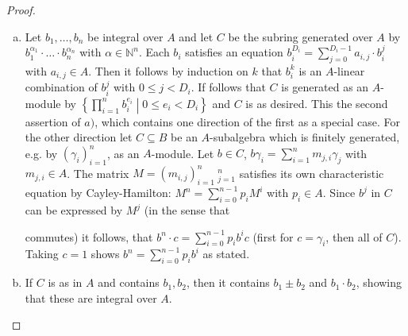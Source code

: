 \documentclass[DIV=14,parskip=half]{scrartcl}
\newenvironment{alphanumerate}{\begin{enumerate}[a)]}{\end{enumerate}}
\theoremstyle{definition}
\newcommand{\N}{\mathbb{N}}
\newcommand{\ldotspam}{,\ldots,}
\begin{document}
\begin{proof}
 \begin{alphanumerate}
  \item Let $b_1\ldotspam b_n$ be integral over $A$ and let $C$ be the subring generated over $A$ by $b_1^{\alpha_1}\cdot\ldots\cdot b_n^{\alpha_n}$ with $\alpha\in \N^n$. Each $b_i$ satisfies an equation $b_i^{D_i} = \sum_{j=0}^{D_i-1} a_{i,j}\cdot b_i^j$ with $a_{i,j}\in A$. Then it follows by induction on $k$ that $b_i^k$ is an $A$-linear combination of $b_i^j$ with $0\leq j < D_i$. If follows that $C$ is generated as an $A$-module by $\left\{\prod_{i=1}^n b_i^{e_i}\middle| 0\leq e_i< D_i\right\}$ and $C$ is as desired. This the second assertion of $a)$, which contains one direction of the first as a special case. For the other direction let $C\subseteq B$ be an $A$-subalgebra which is finitely generated, e.g. by $(\gamma_i)_{i=1}^n$, as an $A$-module. Let $b\in C$, $b\gamma_i=\sum_{i=1}^n m_{j,i} \gamma_j$ with $m_{j,i}\in A$. The matrix $M=(m_{i,j})_{i=1}^n\ _{j=1}^n$ satisfies its own characteristic equation by Cayley-Hamilton: $M^n = \sum_{i=0}^{n-1}p_i M^i$ with $p_i\in A$. Since $b^j$ in $C$ can be expressed by $M^j$ (in the sense that 
  \begin{center}
  \end{center}
  commutes) it follows, that $b^n \cdot c = \sum_{i=0}^{n-1} p_ib^ic$ (first for $c=\gamma_i$, then all of $C$). Taking $c=1$ shows $b^n = \sum_{i=0}^{n-1}p_i b^i$ as stated.
  \item If $C$ is as in $A$ and contains $b_1, b_2$, then it contains $b_1\pm b_2$ and $b_1\cdot b_2$, showing that these are integral over $A$. 

\end{alphanumerate}
\end{proof}
\end{document}

